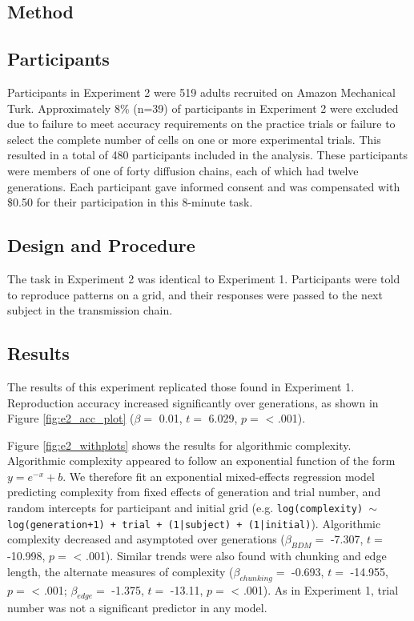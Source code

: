 \documentclass[10pt, letterpaper]{article}
\begin{document}
\subsection{Method}\label{method-1}

\subsection{Participants}\label{participants-1}

Participants in Experiment 2 were 519 adults recruited on Amazon
Mechanical Turk. Approximately 8\% (n=39) of participants in Experiment
2 were excluded due to failure to meet accuracy requirements on the
practice trials or failure to select the complete number of cells on one
or more experimental trials. This resulted in a total of 480
participants included in the analysis. These participants were members
of one of forty diffusion chains, each of which had twelve generations.
Each participant gave informed consent and was compensated with \$0.50
for their participation in this 8-minute task.

\subsection{Design and Procedure}\label{design-and-procedure-1}

The task in Experiment 2 was identical to Experiment 1. Participants
were told to reproduce patterns on a grid, and their responses were
passed to the next subject in the transmission chain.

\subsection{Results}\label{results}

The results of this experiment replicated those found in Experiment 1.
Reproduction accuracy increased significantly over generations, as shown
in Figure \ref{fig:e2_acc_plot} (\(\beta =\) 0.01, \(t =\) 6.029,
\(p =\) \textless{} .001).

Figure \ref{fig:e2_withplots} shows the results for algorithmic
complexity. Algorithmic complexity appeared to follow an exponential
function of the form \(y = e^{-x} + b\). We therefore fit an exponential
mixed-effects regression model predicting complexity from fixed effects
of generation and trial number, and random intercepts for participant
and initial grid (e.g.
\texttt{log(complexity) $\sim$ log(generation+1) + trial + (1|subject) + (1|initial)}).
Algorithmic complexity decreased and asymptoted over generations
(\(\beta_{BDM} =\) -7.307, \(t =\) -10.998, \(p =\) \textless{} .001).
Similar trends were also found with chunking and edge length, the
alternate measures of complexity (\(\beta_{chunking} =\) -0.693, \(t =\)
-14.955, \(p =\) \textless{} .001; \(\beta_{edge} =\) -1.375, \(t =\)
-13.11, \(p =\) \textless{} .001). As in Experiment 1, trial number was
not a significant predictor in any model.
\end{document}

